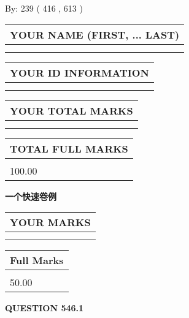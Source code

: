 \documentclass{ctexart}
\begin{document}
   
\hspace{1.0in} By: 
 239 ( 416 ,  613 )
   
   
   
   
\newpage 
\setcounter{page}{ 
   546001 } 
   
   
   
   
\noindent\begin{tabular}{|l|}
\hline
YOUR NAME (FIRST, ... LAST)  \\
\hline
 \\ 
 \\ 
\hline
\end{tabular}
\hspace{0.05in} \begin{tabular}{|l|}
\hline
 YOUR   ID   INFORMATION  \\
\hline
 \\ 
 \\ 
\hline
\end{tabular}
   
   
\vspace{0.2in}\noindent\begin{tabular}{|l|}
\hline
YOUR TOTAL MARKS  \\
\hline
 \\ 
 \\ 
\hline
\end{tabular}
\hspace{0.05in} \begin{tabular}{|l|}
\hline
TOTAL FULL MARKS  \\
\hline
 \\ 
100.00 \\
\hline
\end{tabular}
   
   
 \vspace{0.2in}
{\LARGE {\textbf{ 一个快速卷例}}}
   
   
  
\vspace{0.2in}
  
\noindent\begin{tabular}{|l|}
\hline
 YOUR MARKS  \\
\hline
 \\ 
 \\ 
\hline
\end{tabular}
\hspace{0.05in} \begin{tabular}{|l|}
\hline
 Full Marks  \\
\hline
 \\ 
50.00 \\
\hline
\end{tabular}
{\textbf{\Large{QUESTION
546.1 
}}}
  
\end{document}
